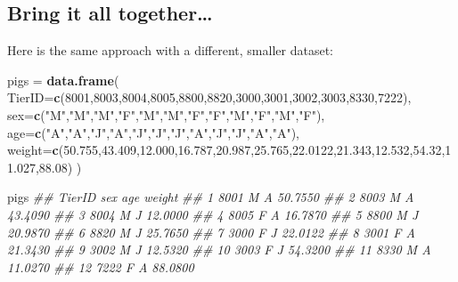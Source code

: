\documentclass[]{book}
\newenvironment{Shaded}{\begin{snugshade}}{\end{snugshade}}
\newcommand{\CommentTok}[1]{\textcolor[rgb]{0.56,0.35,0.01}{\textit{#1}}}
\newcommand{\DataTypeTok}[1]{\textcolor[rgb]{0.13,0.29,0.53}{#1}}
\newcommand{\DecValTok}[1]{\textcolor[rgb]{0.00,0.00,0.81}{#1}}
\newcommand{\FloatTok}[1]{\textcolor[rgb]{0.00,0.00,0.81}{#1}}
\newcommand{\KeywordTok}[1]{\textcolor[rgb]{0.13,0.29,0.53}{\textbf{#1}}}
\newcommand{\NormalTok}[1]{#1}
\newcommand{\StringTok}[1]{\textcolor[rgb]{0.31,0.60,0.02}{#1}}
\begin{document}
\hypertarget{bring-it-all-together}{%
\subsection{Bring it all together\ldots{}}\label{bring-it-all-together}}

Here is the same approach with a different, smaller dataset:

\begin{Shaded}
\begin{Highlighting}[]
\NormalTok{pigs =}\StringTok{ }\KeywordTok{data.frame}\NormalTok{(}
  \DataTypeTok{TierID=}\KeywordTok{c}\NormalTok{(}\DecValTok{8001}\NormalTok{,}\DecValTok{8003}\NormalTok{,}\DecValTok{8004}\NormalTok{,}\DecValTok{8005}\NormalTok{,}\DecValTok{8800}\NormalTok{,}\DecValTok{8820}\NormalTok{,}\DecValTok{3000}\NormalTok{,}\DecValTok{3001}\NormalTok{,}\DecValTok{3002}\NormalTok{,}\DecValTok{3003}\NormalTok{,}\DecValTok{8330}\NormalTok{,}\DecValTok{7222}\NormalTok{),}
  \DataTypeTok{sex=}\KeywordTok{c}\NormalTok{(}\StringTok{"M"}\NormalTok{,}\StringTok{"M"}\NormalTok{,}\StringTok{"M"}\NormalTok{,}\StringTok{"F"}\NormalTok{,}\StringTok{"M"}\NormalTok{,}\StringTok{"M"}\NormalTok{,}\StringTok{"F"}\NormalTok{,}\StringTok{"F"}\NormalTok{,}\StringTok{"M"}\NormalTok{,}\StringTok{"F"}\NormalTok{,}\StringTok{"M"}\NormalTok{,}\StringTok{"F"}\NormalTok{),}
  \DataTypeTok{age=}\KeywordTok{c}\NormalTok{(}\StringTok{"A"}\NormalTok{,}\StringTok{"A"}\NormalTok{,}\StringTok{"J"}\NormalTok{,}\StringTok{"A"}\NormalTok{,}\StringTok{"J"}\NormalTok{,}\StringTok{"J"}\NormalTok{,}\StringTok{"J"}\NormalTok{,}\StringTok{"A"}\NormalTok{,}\StringTok{"J"}\NormalTok{,}\StringTok{"J"}\NormalTok{,}\StringTok{"A"}\NormalTok{,}\StringTok{"A"}\NormalTok{),}
  \DataTypeTok{weight=}\KeywordTok{c}\NormalTok{(}\FloatTok{50.755}\NormalTok{,}\FloatTok{43.409}\NormalTok{,}\FloatTok{12.000}\NormalTok{,}\FloatTok{16.787}\NormalTok{,}\FloatTok{20.987}\NormalTok{,}\FloatTok{25.765}\NormalTok{,}\FloatTok{22.0122}\NormalTok{,}\FloatTok{21.343}\NormalTok{,}\FloatTok{12.532}\NormalTok{,}\FloatTok{54.32}\NormalTok{,}\FloatTok{11.027}\NormalTok{,}\FloatTok{88.08}\NormalTok{)}
\NormalTok{)}

\NormalTok{pigs}
\CommentTok{##    TierID sex age  weight}
\CommentTok{## 1    8001   M   A 50.7550}
\CommentTok{## 2    8003   M   A 43.4090}
\CommentTok{## 3    8004   M   J 12.0000}
\CommentTok{## 4    8005   F   A 16.7870}
\CommentTok{## 5    8800   M   J 20.9870}
\CommentTok{## 6    8820   M   J 25.7650}
\CommentTok{## 7    3000   F   J 22.0122}
\CommentTok{## 8    3001   F   A 21.3430}
\CommentTok{## 9    3002   M   J 12.5320}
\CommentTok{## 10   3003   F   J 54.3200}
\CommentTok{## 11   8330   M   A 11.0270}
\CommentTok{## 12   7222   F   A 88.0800}


\end{Highlighting}
\end{Shaded}
\end{document}

